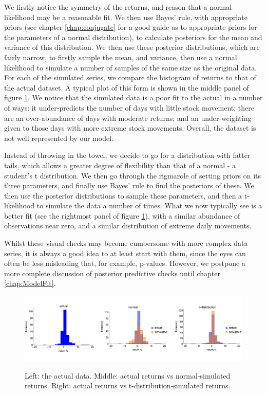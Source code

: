 \documentclass[11pt,fullpage]{book}
\begin{document}
We firstly notice the symmetry of the returns, and reason that a normal likelihood may be a reasonable fit. We then use Bayes' rule, with appropriate priors (see chapter \ref{chap:conjugate} for a good guide as to appropriate priors for the parameters of a normal distribution), to calculate posteriors for the mean and variance of this distribution. We then use these posterior distributions, which are fairly narrow, to firstly sample the mean, and variance, then use a normal likelihood to simulate a number of samples of the same size as the original data. For each of the simulated series, we compare the histogram of returns to that of the actual dataset. A typical plot of this form is shown in the middle panel of figure \ref{fig:Posterior_PPCstockReturns}. We notice that the simulated data is a poor fit to the actual in a number of ways: it under-predicts the number of days with little stock movement; there are an over-abundance of days with moderate returns; and an under-weighting given to those days with more extreme stock movements. Overall, the dataset is not well represented by our model.

Instead of throwing in the towel, we decide to go for a distribution with fatter tails, which allows a greater degree of flexibility than that of a normal - a student's t distribution. We then go through the rigmarole of setting priors on its three parameters, and finally use Bayes' rule to find the posteriors of these. We then use the posterior distributions to sample these parameters, and then a t-likelihood to simulate the data a number of times. What we now typically see is a better fit (see the rightmost panel of figure \ref{fig:Posterior_PPCstockReturns}), with a similar abundance of observations near zero, and a similar distribution of extreme daily movements.

Whilst these visual checks may become cumbersome with more complex data series, it is always a good idea to at least start with them, since the eyes can often be less misleading that, for example, p-values. However, we postpone a more complete discussion of posterior predictive checks until chapter \ref{chap:ModelFit}.

\begin{figure}
\centering
\scalebox{0.35} 
{\includegraphics{Posterior_PPCstockReturns.pdf}}
\caption{Left: the actual data. Middle: actual returns vs normal-simulated returns. Right: actual returns vs t-distribution-simulated returns.}\label{fig:Posterior_PPCstockReturns}
\end{figure}
\end{document}
